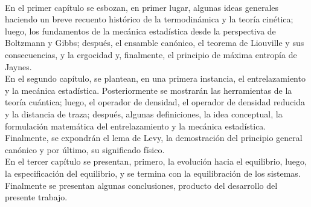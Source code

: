\\
En el primer capítulo se esbozan, en primer lugar, algunas ideas generales haciendo un breve recuento histórico de la termodinámica y la teoría cinética; luego, los fundamentos de la mecánica estadística desde la perspectiva de Boltzmann y Gibbs; después,  el ensamble canónico, el teorema de Liouville  y sus consecuencias, y la ergocidad  y, finalmente, el principio de máxima entropía de Jaynes.     
\\
En el segundo capítulo, se plantean, en una primera instancia, el entrelazamiento y la mecánica estadística. Posteriormente se mostrarán las herramientas de la teoría cuántica; luego, el operador de densidad, el operador de densidad reducida y la distancia de traza; después, algunas definiciones, la idea conceptual, la formulación matemática del entrelazamiento y la mecánica estadística. Finalmente, se expondrán el lema de Levy, la demostración del principio general canónico y por último, su significado físico.
\\
En el tercer capítulo se presentan, primero, la evolución hacia el equilibrio, luego, la especificación del equilibrio, y se termina con la equilibración de los sistemas.
\\
Finalmente se presentan algunas conclusiones, producto del desarrollo del presente trabajo. 


